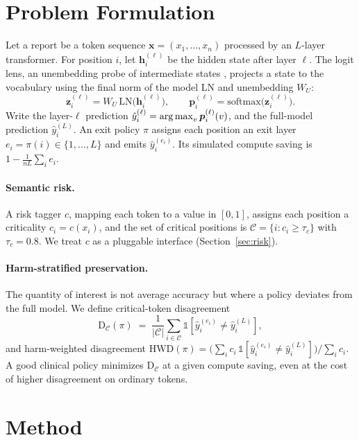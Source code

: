 \documentclass[11pt]{article}
\newcommand{\critset}{\mathcal{C}}
\newcommand{\argmax}{\operatornamewithlimits{arg\,max}}
\begin{document}
\section{Problem Formulation}
\label{sec:formulation}
Let a report be a token sequence $\bm{x} = (x_1,\dots,x_n)$ processed by an $L$-layer transformer. For
position $i$, let $\bm{h}_i^{(\ell)}$ be the hidden state after layer $\ell$. The logit lens, an
unembedding probe of intermediate states \cite{tunedlens2023}, projects a state to the vocabulary using
the final norm of the model $\mathrm{LN}$ and unembedding $W_U$:
\begin{equation}
\bm{z}_i^{(\ell)} = W_U\,\mathrm{LN}\!\big(\bm{h}_i^{(\ell)}\big),
\qquad
\bm{p}_i^{(\ell)} = \mathrm{softmax}\big(\bm{z}_i^{(\ell)}\big).
\end{equation}
Write the layer-$\ell$ prediction $\hat{y}_i^{(\ell)} = \argmax_v \bm{p}_i^{(\ell)}(v)$, and the
full-model prediction $\hat{y}_i^{(L)}$. An exit policy $\pi$ assigns each position an exit layer
$e_i = \pi(i) \in \{1,\dots,L\}$ and emits $\hat{y}_i^{(e_i)}$. Its simulated compute saving is
$1 - \tfrac{1}{nL}\sum_i e_i$.

\paragraph{Semantic risk.}
A risk tagger $c$, mapping each token to a value in $[0,1]$, assigns each position a criticality $c_i = c(x_i)$, and the
set of critical positions is $\critset = \{i : c_i \ge \tau_c\}$ with $\tau_c = 0.8$. We treat $c$ as a
pluggable interface (Section~\ref{sec:risk}).

\paragraph{Harm-stratified preservation.}
The quantity of interest is not average accuracy but where a policy deviates from the full model. We
define critical-token disagreement
\begin{equation}
\mathrm{D}_\critset(\pi) \;=\; \frac{1}{|\critset|}\sum_{i\in\critset}
\mathbb{1}\!\left[\hat{y}_i^{(e_i)} \neq \hat{y}_i^{(L)}\right],
\end{equation}
and harm-weighted disagreement $\mathrm{HWD}(\pi)=\big(\sum_i c_i \,\mathbb{1}[\hat
y_i^{(e_i)}\neq\hat y_i^{(L)}]\big)/\sum_i c_i$. A good clinical policy minimizes $\mathrm{D}_\critset$
at a given compute saving, even at the cost of higher disagreement on ordinary tokens.

\section{Method}
\label{sec:method}
\end{document}
